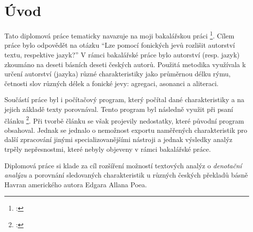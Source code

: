 \documentclass[dp.tex]{subfiles}
\begin{document}
\chapter*{Úvod}
\label{chap:uvod} 


Tato diplomová práce tematicky navazuje na moji bakalářskou práci \footnote{\cite{Slahora2012}: }. Cílem práce bylo odpovědět na otázku \enquote{Lze pomocí fonických jevů rozlišit autorství textu, respektive jazyk?} V rámci bakalářské práce bylo autorství (resp. jazyk) zkoumáno na deseti básních deseti českých autorů. Použitá metodika využívala k určení autorství (jazyka) různé charakteristiky jako průměrnou délku rýmu, četnosti slov různých délek a fonické jevy: agregaci, asonanci a aliteraci.

Součástí práce byl i počítačový program, který počítal dané charakteristiky a na jejich základě texty porovnával. Tento program byl následně využit při psaní článku \footnote{\cite{Marek2013}: }. Při tvorbě článku se však projevily nedostatky, které původní program obsahoval. Jednak se jednalo o nemožnost exportu naměřených charakteristik pro další zpracování jinými specializovanějšími nástroji a jednak výsledky analýz trpěly nepřesnostmi, které nebyly objeveny v rámci bakalářské práce.

Diplomová práce si klade za cíl rozšíření možností textových analýz o \textit{denotační analýzu} a porovnání sledovaných charakteristik u různých českých překladů básně Havran amerického autora Edgara Allana Poea.
\end{document}
